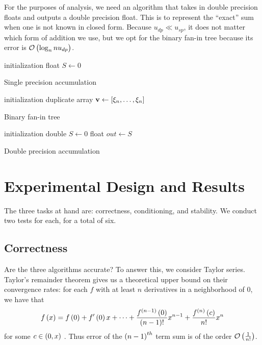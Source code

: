 \documentclass[12pt]{article}
\theoremstyle{definition}
\begin{document}
For the purposes of analysis, we need an algorithm that takes in double precision floats and outputs a double precision float. This is to represent the ``exact'' sum when one is not known in closed form. Because $u_{dp} \ll u_{sp}$, it does not matter which form of addition we use, but we opt for the binary fan-in tree because its error is $\mathcal{O}\del{\log_n n u_{dp}}$.

\begin{algorithm}[H]
\SetAlgoLined
{}
initialization\;
float $S \leftarrow 0$\;
 \;
 \caption{Single precision accumulation}
 \label{algorithm1}
\end{algorithm}

\begin{algorithm}[H]
\SetAlgoLined
{}
initialization\;
duplicate array $\mathbf{v} \leftarrow \sbr{\xi_n,\dots,\xi_n}$\;
 \;
 \caption{Binary fan-in tree}
\end{algorithm}

\begin{algorithm}[H]
\SetAlgoLined
{}
initialization\;
double $S \leftarrow 0$\;
 float $out \leftarrow S$\;
 \;
 \caption{Double precision accumulation}
\end{algorithm}

\section{Experimental Design and Results}
The three tasks at hand are: correctness, conditioning, and stability. We conduct two tests for each, for a total of six.
\subsection{Correctness}
Are the three algorithms accurate? To answer this, we consider Taylor series. Taylor's remainder theorem gives us a theoretical upper bound on their convergence rates: for each $f$ with at least $n$ derivatives in a neighborhood of $0$, we have that
$$
f\del{x} = f\del{0} + f'\del{0}x + \cdots + \frac{f^{\del{n-1}}\del{0}}{\del{n-1}!}x^{n-1} + \frac{f^{\del{n}}\del{c}}{n!}x^{n}
$$
for some $c \in \del{0,x}$ \cite{kincaid}. Thus error of the $\del{n-1}^{th}$ term sum is of the order $\mathcal{O}\del{\frac{1}{n!}}$.
\end{document}
